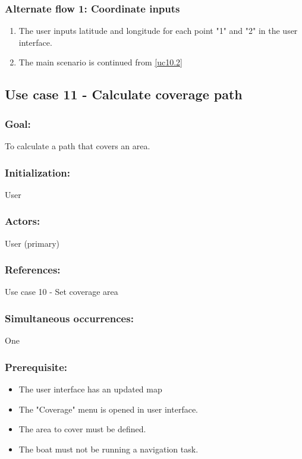\begin{framed}
	\subsubsection*{Alternate flow 1: Coordinate inputs}
		\begin{enumerate}
			\item The user inputs latitude and longitude for each point "1" and "2" in the user interface.
			\item The main scenario is continued from \ref{uc10.2}
		\end{enumerate}
\end{framed}	

\begin{framed}
	\subsection{Use case 11 - Calculate coverage path}
	\subsubsection*{Goal:}
	To calculate a path that covers an area.
	
	\subsubsection*{Initialization:}
	User
	
	\subsubsection*{Actors:}
	User (primary)
	
	\subsubsection*{References:}
	Use case 10 - Set coverage area
	
	\subsubsection*{Simultaneous occurrences:}
	One 
	
	\subsubsection*{Prerequisite:}
	\begin{itemize}
		\item The user interface has an updated map
		\item The "Coverage" menu is opened in user interface.
		\item The area to cover must be defined.
		\item The boat must not be running a navigation task.
	\end{itemize}
	

\end{framed}
